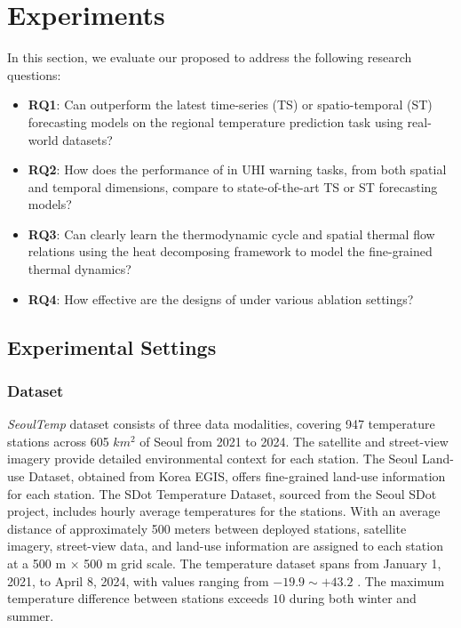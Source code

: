 \section{Experiments}


\label{sec:eval}
In this section, we evaluate our proposed \model to address the following research questions:
\begin{itemize}[leftmargin=*]
    \item \textbf{RQ1}: Can \model outperform the latest time-series (TS) or spatio-temporal (ST) forecasting models on the regional temperature prediction task using real-world datasets?
    \item \textbf{RQ2}: How does the performance of \model in UHI warning tasks, from both spatial and temporal dimensions, compare to state-of-the-art TS or ST forecasting models?
    \item \textbf{RQ3}: Can \model clearly learn the thermodynamic cycle and spatial thermal flow relations using the heat decomposing framework to model the fine-grained thermal dynamics?
    \item \textbf{RQ4}: How effective are the designs of \model under various ablation settings?
    
\end{itemize}

\subsection{Experimental Settings}
\subsubsection{Dataset}
\textit{SeoulTemp} dataset consists of three data modalities, covering 947 temperature stations across 605 $km^2$ of Seoul from 2021 to 2024. The satellite and street-view imagery provide detailed environmental context for each station. The Seoul Land-use Dataset, obtained from Korea EGIS, offers fine-grained land-use information for each station. The SDot Temperature Dataset, sourced from the Seoul SDot project, includes hourly average temperatures for the stations. With an average distance of approximately 500 meters between deployed stations, satellite imagery, street-view data, and land-use information are assigned to each station at a 500 m $\times$ 500 m grid scale. The temperature dataset spans from January 1, 2021, to April 8, 2024, with values ranging from $-19.9 \sim +43.2$ \textcelsius. The maximum temperature difference between stations exceeds $10$ \textcelsius during both winter and summer.
